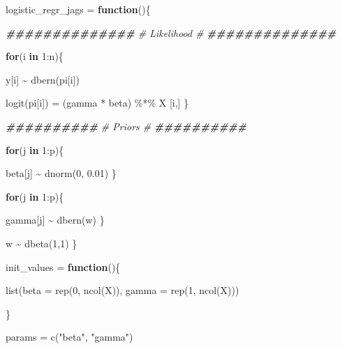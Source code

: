 \documentclass[
]{article}
\newenvironment{Shaded}{\begin{snugshade}}{\end{snugshade}}
\newcommand{\AttributeTok}[1]{\textcolor[rgb]{0.77,0.63,0.00}{#1}}
\newcommand{\CommentTok}[1]{\textcolor[rgb]{0.56,0.35,0.01}{\textit{#1}}}
\newcommand{\ControlFlowTok}[1]{\textcolor[rgb]{0.13,0.29,0.53}{\textbf{#1}}}
\newcommand{\DecValTok}[1]{\textcolor[rgb]{0.00,0.00,0.81}{#1}}
\newcommand{\DocumentationTok}[1]{\textcolor[rgb]{0.56,0.35,0.01}{\textbf{\textit{#1}}}}
\newcommand{\FloatTok}[1]{\textcolor[rgb]{0.00,0.00,0.81}{#1}}
\newcommand{\FunctionTok}[1]{\textcolor[rgb]{0.00,0.00,0.00}{#1}}
\newcommand{\NormalTok}[1]{#1}
\newcommand{\OtherTok}[1]{\textcolor[rgb]{0.56,0.35,0.01}{#1}}
\newcommand{\SpecialCharTok}[1]{\textcolor[rgb]{0.00,0.00,0.00}{#1}}
\newcommand{\StringTok}[1]{\textcolor[rgb]{0.31,0.60,0.02}{#1}}
\begin{document}
\begin{Shaded}
\begin{Highlighting}[]
\NormalTok{logistic\_regr\_jags }\OtherTok{=} \ControlFlowTok{function}\NormalTok{()\{}
  
  \DocumentationTok{\#\#\#\#\#\#\#\#\#\#\#\#\#\#}
  \CommentTok{\# Likelihood \#}
  \DocumentationTok{\#\#\#\#\#\#\#\#\#\#\#\#\#\#}
  
  \ControlFlowTok{for}\NormalTok{(i }\ControlFlowTok{in} \DecValTok{1}\SpecialCharTok{:}\NormalTok{n)\{}
    
\NormalTok{    y[i] }\SpecialCharTok{\textasciitilde{}} \FunctionTok{dbern}\NormalTok{(pi[i])}
    
    \FunctionTok{logit}\NormalTok{(pi[i]) }\OtherTok{=}\NormalTok{ (gamma }\SpecialCharTok{*}\NormalTok{ beta) }\SpecialCharTok{\%*\%}\NormalTok{ X [i,]}
\NormalTok{  \}}
  
  \DocumentationTok{\#\#\#\#\#\#\#\#\#\#}
  \CommentTok{\# Priors \#}
  \DocumentationTok{\#\#\#\#\#\#\#\#\#\#}
  
  \ControlFlowTok{for}\NormalTok{(j }\ControlFlowTok{in} \DecValTok{1}\SpecialCharTok{:}\NormalTok{p)\{}

\NormalTok{    beta[j] }\SpecialCharTok{\textasciitilde{}} \FunctionTok{dnorm}\NormalTok{(}\DecValTok{0}\NormalTok{, }\FloatTok{0.01}\NormalTok{) }
\NormalTok{  \}}
  
  \ControlFlowTok{for}\NormalTok{(j }\ControlFlowTok{in} \DecValTok{1}\SpecialCharTok{:}\NormalTok{p)\{}

\NormalTok{    gamma[j] }\SpecialCharTok{\textasciitilde{}} \FunctionTok{dbern}\NormalTok{(w) }
\NormalTok{  \}}
  
\NormalTok{  w }\SpecialCharTok{\textasciitilde{}} \FunctionTok{dbeta}\NormalTok{(}\DecValTok{1}\NormalTok{,}\DecValTok{1}\NormalTok{)}
\NormalTok{\}}
\end{Highlighting}
\end{Shaded}

\begin{Shaded}
\begin{Highlighting}[]
\NormalTok{init\_values }\OtherTok{=} \ControlFlowTok{function}\NormalTok{()\{}
  
  \FunctionTok{list}\NormalTok{(}\AttributeTok{beta =} \FunctionTok{rep}\NormalTok{(}\DecValTok{0}\NormalTok{, }\FunctionTok{ncol}\NormalTok{(X)), }\AttributeTok{gamma =} \FunctionTok{rep}\NormalTok{(}\DecValTok{1}\NormalTok{, }\FunctionTok{ncol}\NormalTok{(X)))}
  
\NormalTok{\}}

\NormalTok{params }\OtherTok{=} \FunctionTok{c}\NormalTok{(}\StringTok{"beta"}\NormalTok{, }\StringTok{"gamma"}\NormalTok{)}
\end{Highlighting}
\end{Shaded}
\end{document}
